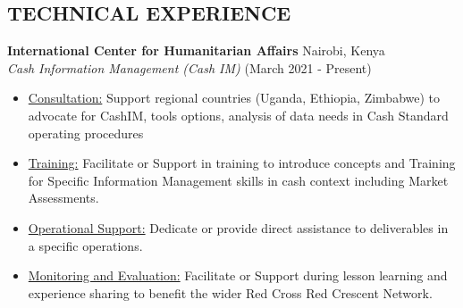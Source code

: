 \documentclass[line,margin,10pt]{res}
\begin{document}
\begin{resume}
\section{TECHNICAL EXPERIENCE}
\textbf{International Center for Humanitarian Affairs} \hfill Nairobi, Kenya\\
{\sl Cash Information Management (Cash IM)} \hfill (March 2021 - Present)
\begin{itemize} \itemsep -2pt
	\item \underline{Consultation:}
    Support regional countries (Uganda, Ethiopia, Zimbabwe) to advocate for CashIM, tools options, analysis of data needs in Cash Standard operating procedures
    \item \underline{Training:}
    Facilitate or Support in training to introduce concepts and Training for Specific Information Management skills in cash context including Market Assessments.
    \item \underline{Operational Support:}
    Dedicate or provide direct assistance to deliverables in a specific operations.
    \item \underline{Monitoring and Evaluation:}
    Facilitate or Support during lesson learning and experience sharing to benefit the wider Red Cross Red Crescent Network.
\end{itemize}


\end{resume}
\end{document}
